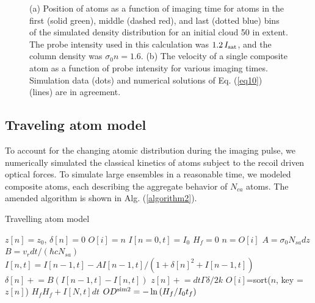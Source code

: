 \documentclass[12pt]{iopart}
\begin{document}
\begin{figure}
\caption{(a) Position of atoms as a function of imaging time for atoms in the first (solid green), middle (dashed red), and last (dotted blue) bins of the simulated density distribution for an initial cloud 50 \um{} in extent. The probe intensity used in this calculation was $1.2\, I_{\rm{sat}}$, and the column density was $\sigma_0 n=1.6$. (b) The velocity of a single composite atom as a function of probe intensity for various imaging times. Simulation data (dots) and numerical  solutions of Eq. (\ref{eq10}) (lines) are in agreement.}
\label{fig:simTests}
\end{figure}

\subsection{Traveling atom model}
To account for the changing atomic distribution during the imaging pulse, we numerically simulated the classical kinetics of atoms subject to the recoil driven optical forces. To simulate large ensembles in a reasonable time, we modeled composite atoms, each describing the aggregate behavior of $N_{ca}$ atoms. The amended algorithm is shown in Alg. (\ref{algorithm2}).
\begin{algorithm}
\caption{Travelling atom model}
\label{algorithm2}
\begin{algorithmic}
\STATE $z[n]=z_0$, $\delta[n]=0$ 
\STATE $O[i]=n$ 
\STATE $I[n=0,t]=I_0$ 
\STATE $H_f=0$ 
\STATE $n=O[i]$ 
 \STATE $A=\sigma_0 N_{sa} dz$ 
 \STATE $B=v_r dt/(\hbar c  N_{sa})$  
\STATE $I[n,t]=I[n-1,t] - A I[n-1,t]/(1+\delta[n]^2+I[n-1,t])$  
\STATE $\delta[n]\mathrel{+}=B\left(I[n-1,t]-I[n,t]\right)$  
\STATE $z[n]\mathrel{+}=dt\Gamma\delta/2k$ 
\ENDFOR
\STATE $O[i]$=sort($n$, key =$z[n]$) 
\STATE $H_f H_f+ I[N,t]dt$ 
\ENDFOR
\STATE $OD^{\rm{sim2}}=-\ln{(H_f/I_0t_f)}$
\end{algorithmic}
\end{algorithm}
\end{document}
